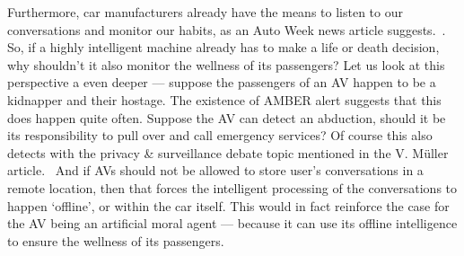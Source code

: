 \documentclass[12pt]{article}
\newcommand{\supercite}[1]{~{\textsuperscript{\cite{#1}}}}
\begin{document}
Furthermore, car manufacturers already have the means to listen to our
conversations and monitor our habits, as an Auto Week news
article suggests.\supercite{auto-week-article}. So, if a highly intelligent 
machine already has to make a life or death decision, why shouldn't it 
also monitor the wellness of its passengers?
Let us look at this perspective a even deeper --- suppose the passengers of 
an AV happen to be a kidnapper and their hostage. The existence of AMBER
alert suggests that this does happen quite often. Suppose the AV can detect
an abduction, should it be its responsibility to pull over and call emergency
services? Of course this also detects with the privacy \& surveillance debate
topic mentioned in the V. Müller article.\supercite{sep-ethics-ai} And if
AVs should not be allowed to store user's conversations in a remote location,
then that forces the intelligent processing of the conversations to happen
`offline', or within the car itself. This would in fact reinforce the case
for the AV being an artificial moral agent --- because it can use its offline
intelligence to ensure the wellness of its passengers.
\pagebreak



\end{document}

